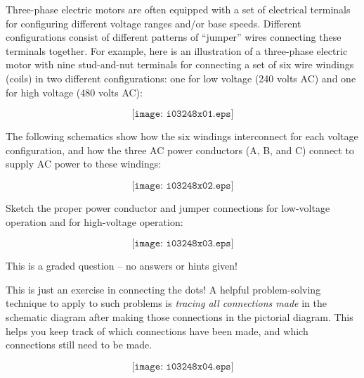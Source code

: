 

Three-phase electric motors are often equipped with a set of electrical terminals for configuring different voltage ranges and/or base speeds.  Different configurations consist of different patterns of ``jumper'' wires connecting these terminals together.  For example, here is an illustration of a three-phase electric motor with nine stud-and-nut terminals for connecting a set of six wire windings (coils) in two different configurations: one for low voltage (240 volts AC) and one for high voltage (480 volts AC):

$$\texttt{[image: i03248x01.eps]}$$

The following schematics show how the six windings interconnect for each voltage configuration, and how the three AC power conductors (A, B, and C) connect to supply AC power to these windings:

$$\texttt{[image: i03248x02.eps]}$$

Sketch the proper power conductor and jumper connections for low-voltage operation and for high-voltage operation:

$$\texttt{[image: i03248x03.eps]}$$

\vfil 

\eject






This is a graded question -- no answers or hints given!
 






This is just an exercise in connecting the dots!  A helpful problem-solving technique to apply to such problems is {\it tracing all connections made} in the schematic diagram after making those connections in the pictorial diagram.  This helps you keep track of which connections have been made, and which connections still need to be made.

$$\texttt{[image: i03248x04.eps]}$$




